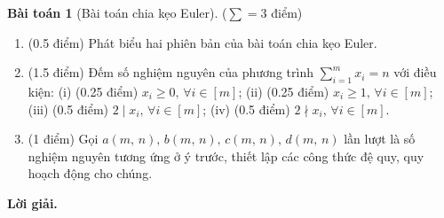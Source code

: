 \documentclass[a4paper, 11pt]{article}
\theoremstyle{definition}
\newtheorem{baitoan}{Bài toán}
\begin{document}
	\begin{tcolorbox}[breakable]
    	\begin{baitoan}[Bài toán chia kẹo Euler] 
			($\sum = 3$ điểm)
			\begin{enumerate}[label=(\alph*)]
				\item (0.5 điểm) Phát biểu hai phiên bản của bài toán chia kẹo Euler.
				\item (1.5 điểm) Đếm số nghiệm nguyên của phương trình $\displaystyle \sum\limits_{i=1}^m x_i = n$ với điều kiện: (i) (0.25 điểm) $x_i \geq 0,\,\forall i\in [m]$; (ii) (0.25 điểm) $x_i \geq 1,\,\forall i\in [m]$; (iii) (0.5 điểm) $2 \mid x_i,\,\forall i\in [m]$; (iv) (0.5 điểm) $2 \nmid x_i,\,\forall i\in [m]$.
				\item (1 điểm) Gọi $a(m,\,n),\,b(m,\,n),\,c(m,\,n),\,d(m,\,n)$ lần lượt là số nghiệm nguyên tương ứng ở ý trước, thiết lập các công thức đệ quy, quy hoạch động cho chúng.
			\end{enumerate}
		\end{baitoan}
	\end{tcolorbox}

	\textbf{Lời giải. }
\end{document}
